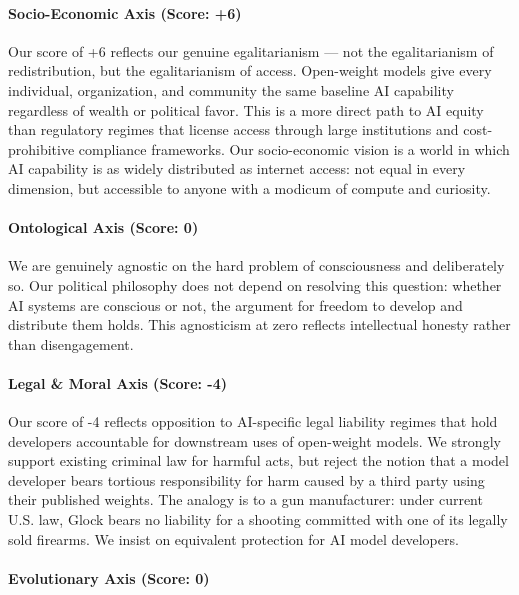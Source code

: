 \paragraph{Socio-Economic Axis (Score:
+6)}\label{socio-economic-axis-score-6-1}

Our score of +6 reflects our genuine egalitarianism --- not the
egalitarianism of redistribution, but the egalitarianism of access.
Open-weight models give every individual, organization, and community
the same baseline AI capability regardless of wealth or political favor.
This is a more direct path to AI equity than regulatory regimes that
license access through large institutions and cost-prohibitive
compliance frameworks. Our socio-economic vision is a world in which AI
capability is as widely distributed as internet access: not equal in
every dimension, but accessible to anyone with a modicum of compute and
curiosity.

\paragraph{Ontological Axis (Score:
0)}\label{ontological-axis-score-0-6}

We are genuinely agnostic on the hard problem of consciousness and
deliberately so. Our political philosophy does not depend on resolving
this question: whether AI systems are conscious or not, the argument for
freedom to develop and distribute them holds. This agnosticism at zero
reflects intellectual honesty rather than disengagement.

\paragraph{Legal \& Moral Axis (Score:
-4)}\label{legal-moral-axis-score--4}

Our score of -4 reflects opposition to AI-specific legal liability
regimes that hold developers accountable for downstream uses of
open-weight models. We strongly support existing criminal law for
harmful acts, but reject the notion that a model developer bears
tortious responsibility for harm caused by a third party using their
published weights. The analogy is to a gun manufacturer: under current
U.S. law, Glock bears no liability for a shooting committed with one of
its legally sold firearms. We insist on equivalent protection for AI
model developers.

\paragraph{Evolutionary Axis (Score:
0)}\label{evolutionary-axis-score-0-2}

